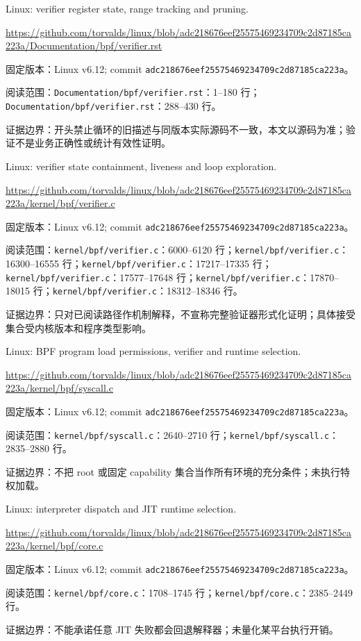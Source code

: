 \documentclass[UTF8,fontset=fandol,openany,11pt]{ctexbook}
\begin{document}
\begin{thebibliography}{999}
 Linux: verifier register state, range tracking and pruning.\par
\url{https://github.com/torvalds/linux/blob/adc218676eef25575469234709c2d87185ca223a/Documentation/bpf/verifier.rst}\par
{\small\raggedright 固定版本：Linux v6.12; commit \texttt{adc21867\allowbreak{}6eef2557\allowbreak{}54692347\allowbreak{}09c2d871\allowbreak{}85ca223a}。\par
阅读范围：\nolinkurl{Documentation/bpf/verifier.rst}：1–180 行；\nolinkurl{Documentation/bpf/verifier.rst}：288–430 行。\par
证据边界：开头禁止循环的旧描述与同版本实际源码不一致，本文以源码为准；验证不是业务正确性或统计有效性证明。
}

 Linux: verifier state containment, liveness and loop exploration.\par
\url{https://github.com/torvalds/linux/blob/adc218676eef25575469234709c2d87185ca223a/kernel/bpf/verifier.c}\par
{\small\raggedright 固定版本：Linux v6.12; commit \texttt{adc21867\allowbreak{}6eef2557\allowbreak{}54692347\allowbreak{}09c2d871\allowbreak{}85ca223a}。\par
阅读范围：\nolinkurl{kernel/bpf/verifier.c}：6000–6120 行；\nolinkurl{kernel/bpf/verifier.c}：16300–16555 行；\nolinkurl{kernel/bpf/verifier.c}：17217–17335 行；\nolinkurl{kernel/bpf/verifier.c}：17577–17648 行；\nolinkurl{kernel/bpf/verifier.c}：17870–18015 行；\nolinkurl{kernel/bpf/verifier.c}：18312–18346 行。\par
证据边界：只对已阅读路径作机制解释，不宣称完整验证器形式化证明；具体接受集合受内核版本和程序类型影响。
}

 Linux: BPF program load permissions, verifier and runtime selection.\par
\url{https://github.com/torvalds/linux/blob/adc218676eef25575469234709c2d87185ca223a/kernel/bpf/syscall.c}\par
{\small\raggedright 固定版本：Linux v6.12; commit \texttt{adc21867\allowbreak{}6eef2557\allowbreak{}54692347\allowbreak{}09c2d871\allowbreak{}85ca223a}。\par
阅读范围：\nolinkurl{kernel/bpf/syscall.c}：2640–2710 行；\nolinkurl{kernel/bpf/syscall.c}：2835–2880 行。\par
证据边界：不把 root 或固定 capability 集合当作所有环境的充分条件；未执行特权加载。
}

 Linux: interpreter dispatch and JIT runtime selection.\par
\url{https://github.com/torvalds/linux/blob/adc218676eef25575469234709c2d87185ca223a/kernel/bpf/core.c}\par
{\small\raggedright 固定版本：Linux v6.12; commit \texttt{adc21867\allowbreak{}6eef2557\allowbreak{}54692347\allowbreak{}09c2d871\allowbreak{}85ca223a}。\par
阅读范围：\nolinkurl{kernel/bpf/core.c}：1708–1745 行；\nolinkurl{kernel/bpf/core.c}：2385–2449 行。\par
证据边界：不能承诺任意 JIT 失败都会回退解释器；未量化某平台执行开销。
}


\end{thebibliography}
\end{document}
